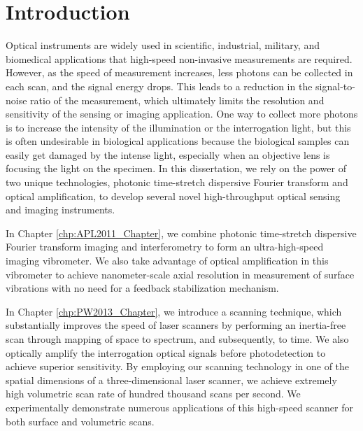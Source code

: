 \chapter{Introduction}
\label{chp:INTRO_Chapter}

Optical instruments are widely used in scientific, industrial, military, and biomedical applications that high-speed non-invasive measurements are required. However, as the speed of measurement increases, less photons can be collected in each scan, and the signal energy drops. This leads to a reduction in the signal-to-noise ratio of the measurement, which ultimately limits the resolution and sensitivity of the sensing or imaging application. One way to collect more photons is to increase the intensity of the illumination or the interrogation light, but this is often undesirable in biological applications because the biological samples can easily get damaged by the intense light, especially when an objective lens is focusing the light on the specimen. In this dissertation, we rely on the power of two unique technologies, photonic time-stretch dispersive Fourier transform and optical amplification, to develop several novel high-throughput optical sensing and imaging instruments.

In Chapter \ref{chp:APL2011_Chapter}, we combine photonic time-stretch dispersive Fourier transform imaging and interferometry to form an ultra-high-speed imaging vibrometer. We also take advantage of optical amplification in this vibrometer to achieve nanometer-scale axial resolution in measurement of surface vibrations with no need for a feedback stabilization mechanism.

In Chapter \ref{chp:PW2013_Chapter}, we introduce a scanning technique, which substantially improves the speed of laser scanners by performing an inertia-free scan through mapping of space to spectrum, and subsequently, to time. We also optically amplify the interrogation optical signals before photodetection to achieve superior sensitivity. By employing our scanning technology in one of the spatial dimensions of a three-dimensional laser scanner, we achieve extremely high volumetric scan rate of hundred thousand scans per second. We experimentally demonstrate numerous applications of this high-speed scanner for both surface and volumetric scans.

